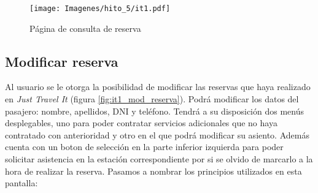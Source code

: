 \begin{figure}[H]
    \centering
    \texttt{[image: Imagenes/hito\_5/it1.pdf]}
    \caption{Página de consulta de reserva}
    \label{fig:it1_consulta_reserva}
\end{figure}


\subsection*{Modificar reserva}

Al usuario se le otorga la posibilidad de modificar las reservas que haya realizado en \textit{Just Travel It} (figura \ref{fig:it1_mod_reserva}). Podrá
modificar los datos del pasajero: nombre, apellidos, DNI y teléfono. Tendrá a su disposición dos menús desplegables,
uno para poder contratar servicios adicionales que no haya contratado con anterioridad y otro en el que podrá
modificar su asiento. Además cuenta con un boton de selección en la parte inferior izquierda para poder solicitar
asistencia en la estación correspondiente por si se olvido de marcarlo a la hora de realizar la reserva. Pasamos
a nombrar los principios utilizados en esta pantalla:

